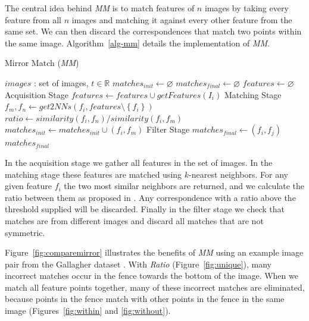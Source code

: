 The central idea behind \emph{MM} is to match features of $n$ images by 
taking every feature from all $n$ images and matching it against every 
other feature from the same set. We can then discard the correspondences 
that match two points within the same image. Algorithm~\ref{alg-mm} 
details the implementation of \emph{MM}.

\begin{algorithm}[htb]
\caption{Mirror Match (\emph{MM})}
\label{alg-mm}
\begin{algorithmic}
\Require $images$ : set of images, $t \in \mathbb{R}$
\State $matches_{init}\gets \varnothing$
\State $matches_{final}\gets \varnothing$
\State $features\gets \varnothing$
 \Comment Acquisition Stage
	\State $features\gets features \cup getFeatures(I_i)$
\EndFor
{} \Comment Matching Stage
	\State $f_m,f_n \gets get2NNs(f_i, features \setminus 
	\left\{f_i\right\})$
	\State $ratio \gets similarity(f_i, f_n) / similarity(f_i, f_m)$
		\State $matches_{init} \gets matches_{init} \cup \left(f_i, f_m\right)$
	\EndIf
\EndFor
{} \Comment Filter 
Stage
		\State $matches_{final} \gets (f_i, f_j)$
	\EndIf
\EndFor \\
\Return $matches_{final}$
\end{algorithmic}
\end{algorithm}

In the acquisition stage we gather all features in the set of images.  
In the matching stage these features are matched using $k$-nearest 
neighbors.  For any given feature $f_i$ the two most similar neighbors 
are returned, and we calculate the ratio between them as proposed in 
\cite{lowe2004sift}.  Any correspondence with a ratio above the 
threshold supplied will be discarded. Finally in the filter stage we 
check that matches are from different images and discard all matches 
that are not symmetric.

Figure~\ref{fig:comparemirror} illustrates the benefits of \emph{MM} 
using an example image pair from the Gallagher dataset 
\cite{gallagher2008}.
With \emph{Ratio} (Figure~\ref{fig:unique}), many incorrect matches occur 
in the fence towards the bottom of the image.
When we match all feature points together, many of these incorrect 
matches are eliminated, because points in the fence match with other 
points in the fence in the same image (Figures~\ref{fig:within} and
\ref{fig:without}).


